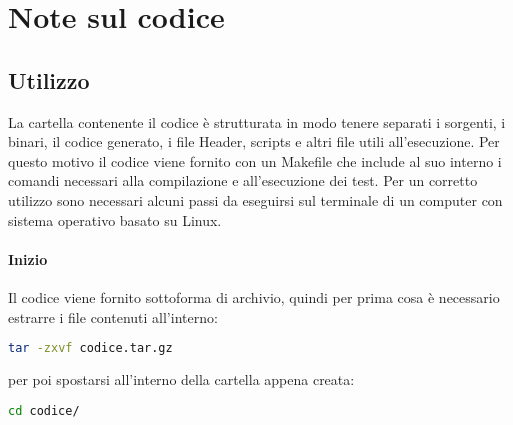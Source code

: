 
\section{Note sul codice}

\subsection{Utilizzo}
La cartella contenente il codice è strutturata in modo tenere separati i sorgenti, i binari, il codice generato,
i file Header, scripts e altri file utili all'esecuzione.
Per questo motivo il codice viene fornito con un \textsf{Makefile} che include al suo interno i comandi
necessari alla compilazione e all'esecuzione dei test.
Per un corretto utilizzo sono necessari alcuni passi da eseguirsi sul terminale di un computer con sistema
operativo basato su Linux.
%
\paragraph{Inizio} Il codice viene fornito sottoforma di archivio, quindi per prima cosa è necessario estrarre
i file contenuti all'interno:
\label{code:make-passo-1}
\begin{lstlisting}[language=bash]
tar -zxvf codice.tar.gz
\end{lstlisting}
per poi spostarsi all'interno della cartella appena creata:
\label{code:make-passo-2}
\begin{lstlisting}[language=bash]
cd codice/
\end{lstlisting}
